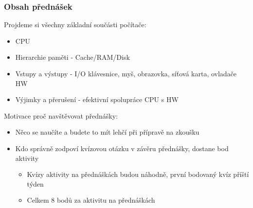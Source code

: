 \documentclass{beamer}
\begin{document}
\begin{frame}
\frametitle{Obsah přednášek}
Projdeme si všechny základní součásti počítače:
\begin{itemize}
\item CPU
\item Hierarchie paměti - Cache/RAM/Disk
\item Vstupy a výstupy - I/O klávesnice, myš, obrazovka, síťová karta, ovladače HW
\item Výjimky a přerušení - efektivní spolupráce CPU s HW
\end{itemize}

Motivace proč navštěvovat přednášky:
\begin{itemize}
\item Něco se naučíte a budete to mít lehčí při přípravě na zkoušku
\item Kdo správně zodpoví kvízovou otázku v závěru přednášky, dostane bod aktivity
  \begin{itemize}
  \item Kvízy aktivity na přednáškách budou náhodně, první bodovaný kvíz příští týden
  \item Celkem 8 bodů za aktivitu na přednáškách
  \end{itemize}
\end{itemize}

\end{frame}
\end{document}
